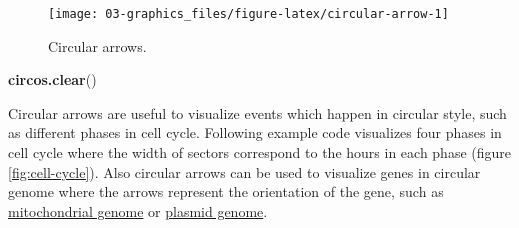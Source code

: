 \documentclass[]{book}
\newenvironment{Shaded}{\begin{snugshade}}{\end{snugshade}}
\newcommand{\KeywordTok}[1]{\textcolor[rgb]{0.13,0.29,0.53}{\textbf{#1}}}
\newcommand{\NormalTok}[1]{#1}
\theoremstyle{definition}
\theoremstyle{definition}
\theoremstyle{remark}
\begin{document}
\begin{figure}

{\centering \texttt{[image: 03-graphics\_files/figure-latex/circular-arrow-1]} 

}

\caption{Circular arrows.}\label{fig:circular-arrow}
\end{figure}

\begin{Shaded}
\begin{Highlighting}[]
\KeywordTok{circos.clear}\NormalTok{()}
\end{Highlighting}
\end{Shaded}

Circular arrows are useful to visualize events which happen in circular
style, such as different phases in cell cycle. Following example code
visualizes four phases in cell cycle where the width of sectors
correspond to the hours in each phase (figure \ref{fig:cell-cycle}).
Also circular arrows can be used to visualize genes in circular genome
where the arrows represent the orientation of the gene, such as
\href{https://en.wikipedia.org/wiki/Mitochondrial_DNA}{mitochondrial
genome} or \href{https://en.wikipedia.org/wiki/Plasmid}{plasmid genome}.
\end{document}
